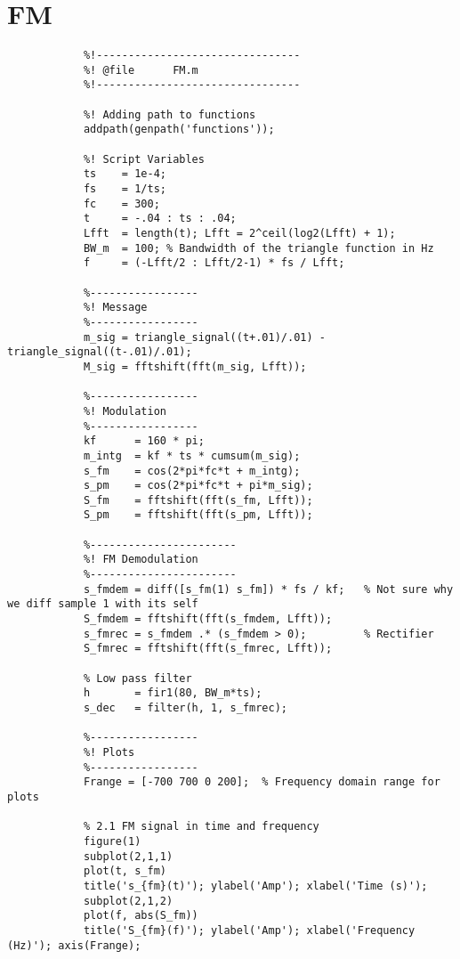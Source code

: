 \documentclass{article}
\begin{document}
    \section{FM}
        \begin{verbatim}
            %!--------------------------------
            %! @file      FM.m
            %!--------------------------------
            
            %! Adding path to functions
            addpath(genpath('functions'));
            
            %! Script Variables
            ts    = 1e-4;
            fs    = 1/ts;
            fc    = 300;
            t     = -.04 : ts : .04;
            Lfft  = length(t); Lfft = 2^ceil(log2(Lfft) + 1);
            BW_m  = 100; % Bandwidth of the triangle function in Hz
            f     = (-Lfft/2 : Lfft/2-1) * fs / Lfft;
            
            %-----------------
            %! Message
            %-----------------
            m_sig = triangle_signal((t+.01)/.01) - triangle_signal((t-.01)/.01);
            M_sig = fftshift(fft(m_sig, Lfft));
            
            %-----------------
            %! Modulation
            %-----------------
            kf      = 160 * pi;
            m_intg  = kf * ts * cumsum(m_sig);
            s_fm    = cos(2*pi*fc*t + m_intg);
            s_pm    = cos(2*pi*fc*t + pi*m_sig);
            S_fm    = fftshift(fft(s_fm, Lfft));
            S_pm    = fftshift(fft(s_pm, Lfft));
            
            %-----------------------
            %! FM Demodulation
            %-----------------------
            s_fmdem = diff([s_fm(1) s_fm]) * fs / kf;   % Not sure why we diff sample 1 with its self
            S_fmdem = fftshift(fft(s_fmdem, Lfft));
            s_fmrec = s_fmdem .* (s_fmdem > 0);         % Rectifier
            S_fmrec = fftshift(fft(s_fmrec, Lfft));
            
            % Low pass filter
            h       = fir1(80, BW_m*ts);
            s_dec   = filter(h, 1, s_fmrec);
            
            %-----------------
            %! Plots
            %-----------------
            Frange = [-700 700 0 200];  % Frequency domain range for plots
            
            % 2.1 FM signal in time and frequency
            figure(1)
            subplot(2,1,1)
            plot(t, s_fm)
            title('s_{fm}(t)'); ylabel('Amp'); xlabel('Time (s)');
            subplot(2,1,2)
            plot(f, abs(S_fm))
            title('S_{fm}(f)'); ylabel('Amp'); xlabel('Frequency (Hz)'); axis(Frange);
            

\end{verbatim}
\end{document}
